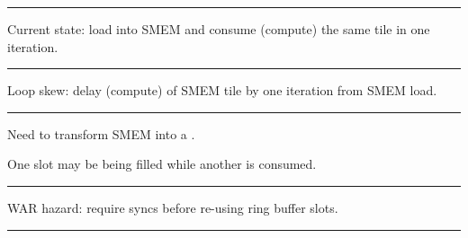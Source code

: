 \hrule

{\LARGE
Current state: load into SMEM and consume (compute) the same tile in one  iteration.
}

\newpage
{}

{
\Large
\begin{tikzpicture}[node distance=0mm]



\end{tikzpicture}
}

\hrule

{\LARGE
Loop skew: delay  (compute) of SMEM tile by one  iteration from SMEM load.

}

\newpage
{}

{
\Large
\begin{tikzpicture}[node distance=0mm]




\end{tikzpicture}
}

\hrule

{\LARGE
Need to transform SMEM into a .

One slot may be being filled while another is consumed.

}

\newpage
{}

{
\Large
\begin{tikzpicture}[node distance=0mm]





\end{tikzpicture}
}

\hrule

{\LARGE
WAR hazard: require syncs before re-using ring buffer slots.

}


\newpage
{}

{
\Large
\begin{tikzpicture}[node distance=0mm]





\end{tikzpicture}
}

\hrule

